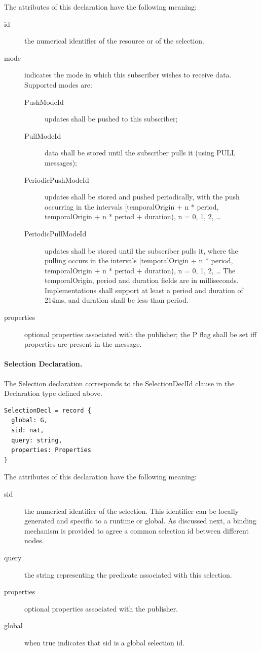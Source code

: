 \documentclass[a4paper,oneside,article]{memoir}
\begin{document}
The attributes of this declaration have the following meaning:
\begin{description}
\item[id] the numerical identifier of the resource or of the selection.
\item[mode] indicates the mode in which this subscriber wishes to receive data. Supported modes are:
  \begin{description}
  \item[PushModeId] updates shall be pushed to this subscriber;
  \item[PullModeId] data shall be stored until the subscriber pulls it (using PULL messages);
  \item[PeriodicPushModeId] updates shall be stored and pushed periodically, with the push occurring
    in the intervals [temporalOrigin + n * period, temporalOrigin + n * period + duration), n = 0,
    1, 2, …
  \item[PeriodicPullModeId] updates shall be stored until the subscriber pulls it, where the pulling
    occurs in the intervals [temporalOrigin + n * period, temporalOrigin + n * period + duration), n
    = 0, 1, 2, …  The temporalOrigin, period and duration fields are in
    milliseconds. Implementations shall support at least a period and duration of 214ms, and
    duration shall be less than period.
  \end{description}
\item[properties] optional properties associated with the publisher; the P flag shall be set iff
  properties are present in the message.
\end{description}

\paragraph{Selection Declaration.} The Selection declaration corresponds to the SelectionDeclId
clause in the Declaration type defined above.
\begin{verbatim}
SelectionDecl = record {
  global: G,
  sid: nat,
  query: string,
  properties: Properties
}  
\end{verbatim}

The attributes of this declaration have the following meaning:
\begin{description}
\item[sid] the numerical identifier of the selection.  This identifier can be locally generated and
  specific to a runtime or global.  As discussed next, a binding mechanism is provided to agree a
  common selection id between different nodes.
\item[query] the string representing the predicate associated with this selection.
\item[properties] optional properties associated with the publisher.
\item[global] when true indicates that sid is a global selection id.
\end{description}
\end{document}
